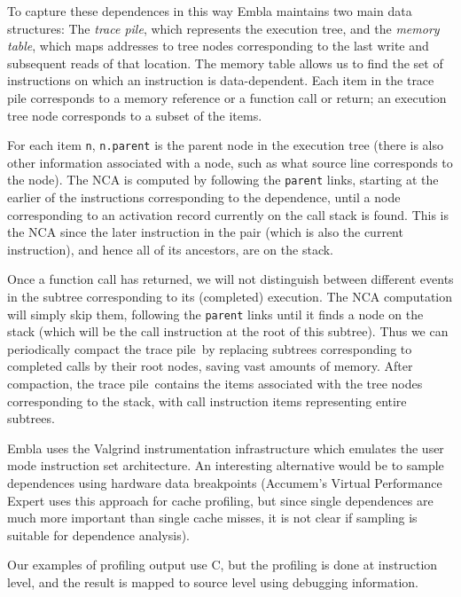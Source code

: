 \newcommand{\tracepile}{trace pile}

To capture these dependences in this way
Embla maintains two main data structures: The {\em \tracepile}, which represents
the execution tree, and the {\em memory table}, which maps addresses to tree
nodes corresponding to the last write and subsequent reads of that
location. The memory table allows us to find the set of instructions
on which an instruction is data-dependent.
Each item in the trace pile corresponds to a memory reference 
or a function call or return; an execution tree node corresponds to
a subset of the items.

For each item {\tt n}, {\tt n.parent} is the parent node in the
execution tree (there is also other information associated with a
node, such as what source line corresponds to the node).  The NCA is
computed by following the {\tt parent} links, starting at the earlier
of the instructions corresponding to the dependence, until a node
corresponding to an activation record currently on the call stack is
found. This is the NCA since the later instruction in the pair (which
is also the current instruction), and hence all of its ancestors, are
on the stack.

Once a function call has returned, we will not distinguish between 
different events in the subtree corresponding to its (completed) 
execution. The NCA computation will simply skip them, following the 
{\tt parent} links until it finds a node on the stack (which will be
the call instruction at the root of this subtree). Thus we can 
periodically compact the \tracepile\ by replacing subtrees
corresponding to completed calls by their root nodes, saving vast amounts
of memory.
After compaction, the \tracepile\ contains the items associated with the
tree nodes corresponding to the stack, with call instruction items
representing entire subtrees.

Embla uses the Valgrind instrumentation infrastructure which emulates
the user mode instruction set architecture. An interesting alternative
would be to sample dependences using hardware data breakpoints
(Accumem's Virtual Performance Expert uses this approach for cache
profiling, but since single dependences are much more important than
single cache misses, it is not clear if sampling is suitable for
dependence analysis).

Our examples of profiling
output use C, but
the profiling is done at instruction level, and the result is
mapped to source level using debugging information.


